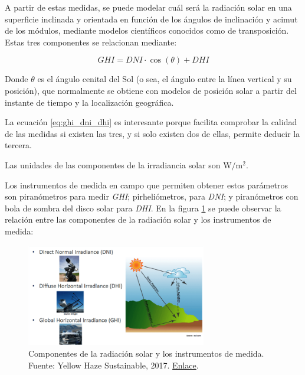 A partir de estas medidas, se puede modelar cuál será la radiación solar en una superficie inclinada y orientada en función de los ángulos de inclinación y \gls{acimut} de los módulos, mediante modelos científicos conocidos como de \gls{transposición}. Estas tres componentes se relacionan mediante:

\begin{equation} \label{eq:ghi_dni_dhi}
      GHI = DNI \cdot \cos(\theta) + DHI
\end{equation}

Donde $\theta$ es el ángulo cenital del Sol (o sea, el ángulo entre la línea vertical y su posición), que normalmente se obtiene con modelos de posición solar a partir del instante de tiempo y la localización geográfica.

La ecuación \ref{eq:ghi_dni_dhi} es interesante porque facilita comprobar la calidad de las medidas si existen las tres, y si solo existen dos de ellas, permite deducir la tercera.

Las unidades de las componentes de la irradiancia solar son $\si{\watt\per\meter\squared}$.

Los instrumentos de medida en campo que permiten obtener estos parámetros son \gls{piranómetros} para medir \textit{\gls{GHI}}; \gls{pirheliómetros}, para \textit{\gls{DNI}}; y \gls{piranómetros} con bola de sombra del disco solar para \textit{\gls{DHI}}. En la figura \ref{fig:irrad_componentes} se puede observar la relación entre las componentes de la radiación solar y los instrumentos de medida:

\begin{figure}[H]
      \centering
      \includegraphics[width=0.7\textwidth]{./images/SoA_irrad/dni-dhi-ghi-1-768x437.png}
      \caption{Componentes de la radiación solar y los instrumentos de medida. Fuente: Yellow Haze Sustainable, 2017. \href{http://web.archive.org/web/20230624215046/https://yellowhaze.in/wp-content/uploads/2017/01/dni-dhi-ghi-1-768x437.png}{Enlace}.}
      \label{fig:irrad_componentes}
\end{figure}

